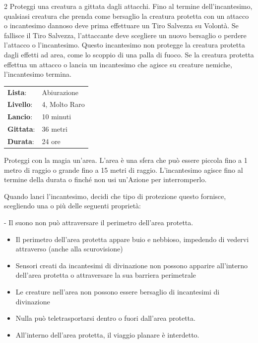 \begin{multicols}{2}
Proteggi una creatura a gittata dagli attacchi. Fino al termine dell'incantesimo, qualsiasi creatura che prenda come bersaglio la creatura protetta con un attacco o incantesimo dannoso deve prima effettuare un Tiro Salvezza su Volontà. Se fallisce il Tiro Salvezza, l'attaccante deve scegliere un nuovo bersaglio o perdere l'attacco o l'incantesimo. Questo incantesimo non protegge la creatura protetta dagli effetti ad area, come lo scoppio di una palla di fuoco. Se la creatura protetta effettua un attacco o lancia un incantesimo che agisce su creature nemiche, l'incantesimo termina.

\noindent\begin{tabularx}{\linewidth}{p{1.9cm}X}
	\rowcolor{gray!20}\textbf{Lista}: & Abiurazione \\
	\textbf{Livello}: & 4, Molto Raro \\
	\rowcolor{gray!20}\textbf{Lancio}: & 10 minuti \\
	\textbf{Gittata}: & 36 metri \\
	\rowcolor{gray!20}\textbf{Durata}: & 24 ore \\
\end{tabularx}\smallskip

Proteggi con la magia un'area. L'area è una sfera che può essere piccola fino a 1 metro di raggio o grande fino a 15 metri di raggio. L'incantesimo agisce fino al termine della durata o finché non usi un'Azione per interromperlo.

Quando lanci l'incantesimo, decidi che tipo di protezione questo fornisce, scegliendo una o più delle seguenti proprietà:

\noindent- Il suono non può attraversare il perimetro dell'area protetta.

\begin{itemize}[leftmargin=*] \setlength{\itemsep}{0pt}
	\item Il perimetro dell'area protetta appare buio e nebbioso, impedendo di vedervi attraverso (anche alla scurovisione)
	\item Sensori creati da incantesimi di divinazione non possono apparire all'interno dell'area protetta o attraversare la sua barriera perimetrale
	\item Le creature nell'area non possono essere bersaglio di incantesimi di divinazione
	\item Nulla può teletrasportarsi dentro o fuori dall'area protetta.
	\item All'interno dell'area protetta, il viaggio planare è interdetto.
\end{itemize}


\end{multicols}

